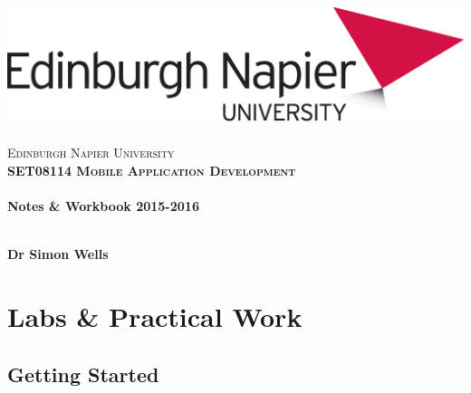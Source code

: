 \documentclass[12pt, a4paper, twoside]{book}
\begin{document}
\frontmatter

\begin{titlepage}
\vspace*{5cm}
\begin{center}
\includegraphics[width=.5\textwidth]{images/EdNapUniLogoCMYK}~\\[1cm]

\textsc{\Large Edinburgh Napier University}\\[1.5cm]

\textsc{\LARGE \bfseries SET08114 Mobile Application Development}\\[0.5cm]

\hrulefill \\[0.4cm]
{\huge \bfseries Notes \& Workbook 2015-2016 \\[0.4cm] }
\hrulefill \\[1.5cm]

\begin{minipage}{0.4\textwidth}
\begin{flushleft} \large
\textbf{Dr Simon Wells} \\
\end{flushleft}
\end{minipage}

\vfill

\end{center}
\end{titlepage}


\setcounter{tocdepth}{2}
\cleardoublepage
\tableofcontents
\listoffigures
{}

\mainmatter


\part{Labs \& Practical Work}

\chapter{Getting Started}
\label{lab1}
\end{document}
